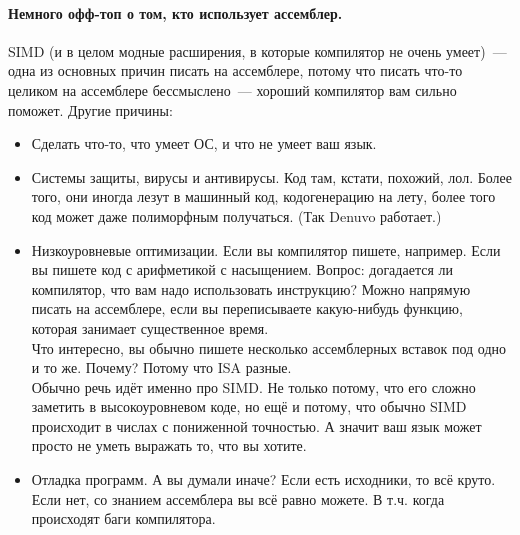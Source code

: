 \documentclass{article}
\begin{document}
    \paragraph{Немного офф-топ о том, кто использует ассемблер.}
    SIMD (и в целом модные расширения, в которые компилятор не очень умеет)~--- одна из основных причин писать на ассемблере, потому что писать что-то целиком на ассемблере бессмыслено~--- хороший компилятор вам сильно поможет. Другие причины:
    \begin{itemize}
        \item Сделать что-то, что умеет ОС, и что не умеет ваш язык.
        \item Системы защиты, вирусы и антивирусы. Код там, кстати, похожий, лол. Более того, они иногда лезут в машинный код, кодогенерацию на лету, более того код может даже полиморфным получаться. (Так Denuvo работает.)
        \item Низкоуровневые оптимизации. Если вы компилятор пишете, например. Если вы пишете код с арифметикой с насыщением. Вопрос: догадается ли компилятор, что вам надо использовать инструкцию? Можно напрямую писать на ассемблере, если вы переписываете какую-нибудь функцию, которая занимает существенное время.\\
        Что интересно, вы обычно пишете несколько ассемблерных вставок под одно и то же. Почему? Потому что ISA разные.\\
        Обычно речь идёт именно про SIMD. Не только потому, что его сложно заметить в высокоуровневом коде, но ещё и потому, что обычно SIMD происходит в числах с пониженной точностью. А значит ваш язык может просто не уметь выражать то, что вы хотите.
        \item Отладка программ. А вы думали иначе? Если есть исходники, то всё круто. Если нет, со знанием ассемблера вы всё равно можете. В т.ч. когда происходят баги компилятора.
    \end{itemize}
\end{document}
